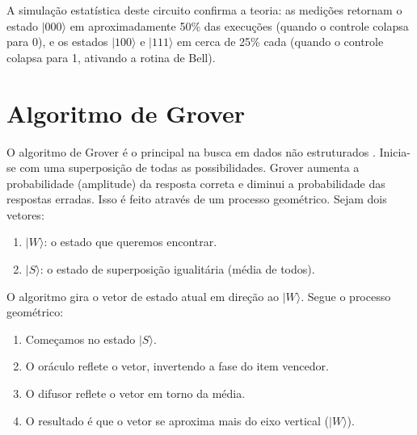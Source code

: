 \documentclass[12pt, a4paper]{article}
\newcommand{\ket}[1]{\lvert #1 \rangle}
\begin{document}
A simulação estatística deste circuito confirma a teoria: as medições retornam o estado $\ket{000}$ em aproximadamente 50\% das execuções (quando o controle colapsa para 0), e os estados $\ket{100}$ e $\ket{111}$ em cerca de 25\% cada (quando o controle colapsa para 1, ativando a rotina de Bell). 

\section{Algoritmo de Grover}

O algoritmo de Grover é o principal na busca em dados não estruturados \cite{nielsen2010}. Inicia-se com uma superposição de todas as possibilidades. Grover aumenta a probabilidade (amplitude) da resposta correta e diminui a probabilidade das respostas erradas. Isso é feito através de um processo geométrico. Sejam dois vetores:
\begin{enumerate}
    \item $\ket{W}$: o estado que queremos encontrar.
    \item $\ket{S}$: o estado de superposição igualitária (média de todos).
\end{enumerate}

O algoritmo gira o vetor de estado atual em direção ao $\ket{W}$. Segue o processo geométrico:
\begin{enumerate}
    \item Começamos no estado $\ket{S}$.
    \item O oráculo reflete o vetor, invertendo a fase do item vencedor.
    \item O difusor reflete o vetor em torno da média.
    \item O resultado é que o vetor se aproxima mais do eixo vertical ($\ket{W}$).
\end{enumerate}
\end{document}
